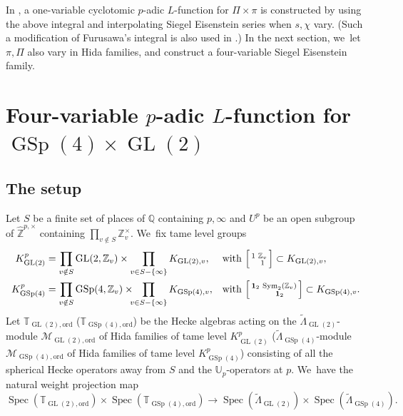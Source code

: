 \documentclass[JEP,XML,SOM,Unicode,published]{cedram}
\newenvironment{Smallbmatrix}{\Big[\begin{smallmatrix}}{\end{smallmatrix}\Big]}
\newcommand{\Lfunction}{$L$\nobreakdash-func\-tion\xspace}
\theoremstyle{plain}
\theoremstyle{remark}
\newcommand{\bQ}{\mathbb{Q}}
\newcommand{\bT}{\mathbb{T}}
\newcommand{\bU}{\mathbb{U}}
\newcommand{\bZ}{\mathbb{Z}}
\newcommand{\cM}{\mathcal{M}}
\DeclareMathOperator{\GL}{GL}
\DeclareMathOperator{\GSp}{GSp}
\newcommand{\ord}{\mathrm{ord}}
\DeclareMathOperator{\Spec}{Spec}
\DeclareMathOperator{\Sym}{Sym}
\newcommand{\bid}{\mathbf{1}}
\begin{document}
In \cite{pFL}, a one-variable cyclotomic $p$-adic \Lfunction for $\Pi\times\pi$ is constructed by using the above integral and interpolating Siegel Eisenstein series when $s,\chi$ vary. (Such a modification of Furusawa's integral is also used in \cite{Morimoto-GSp4GL2-I,Morimoto-GSp4GL2-II}.) In the next section, we~let $\pi,\Pi$ also vary in Hida families, and construct a four-variable Siegel Eisenstein family.

\section{Four-variable \texorpdfstring{$p$-adic \protect\Lfunction for $\GSp(4)\times\GL(2)$}{pGL}}

\subsection{The setup}\label{sec:setup}
Let $S$ be a finite set of places of $\bQ$ containing $p,\infty$ and $U^p$ be an open subgroup of $\hat{\bZ}^{p,\times}$ containing $\prod_{v\notin S} \bZ^\times_v$. We~fix tame level groups\begin{align*}
\setlength{\arraycolsep}{2pt}
K^p_{\GL(2)}&=\prod_{v\notin S}\GL(2,\bZ_v)\times\prod_{v\in S-\{\infty\}} K_{\GL(2),v}, &&\text{with }\begin{Smallbmatrix}1&\bZ_v\\&1\end{Smallbmatrix}\subset K_{\GL(2),v},\\
K^p_{\GSp(4)}&=\prod_{v\notin S}\GSp(4,\bZ_v)\times\hspace{-.5em}\prod_{v\in S-\{\infty\}} K_{\GSp(4),v},&&\text{with }\begin{Smallbmatrix}\bid_2&\Sym_2(\bZ_v)\\&\bid_2\end{Smallbmatrix}\subset K_{\GSp(4),v}.
\end{align*}
Let $\bT_{\GL(2),\ord}$ (\resp $\bT_{\GSp(4),\ord}$) be the Hecke algebras acting on the $\tilde{\Lambda}_{\GL(2)}$-module $\cM_{\GL(2),\ord}$ of Hida families of tame level $K^p_{\GL(2)}$ (\resp $\tilde{\Lambda}_{\GSp(4)}$-module $\cM_{\GSp(4),\ord}$ of Hida families of tame level $K^p_{\GSp(4)}$) consisting of all the spherical Hecke operators away from $S$ and the $\bU_p$-operators at $p$. We~have the natural weight projection map
\begin{equation}\label{eq:wtproj}
\Spec(\bT_{\GL(2),\ord})\times\Spec(\bT_{\GSp(4),\ord})
\to \Spec(\tilde{\Lambda}_{\GL(2)})\times \Spec(\tilde{\Lambda}_{\GSp(4)}).
\end{equation}
\end{document}

